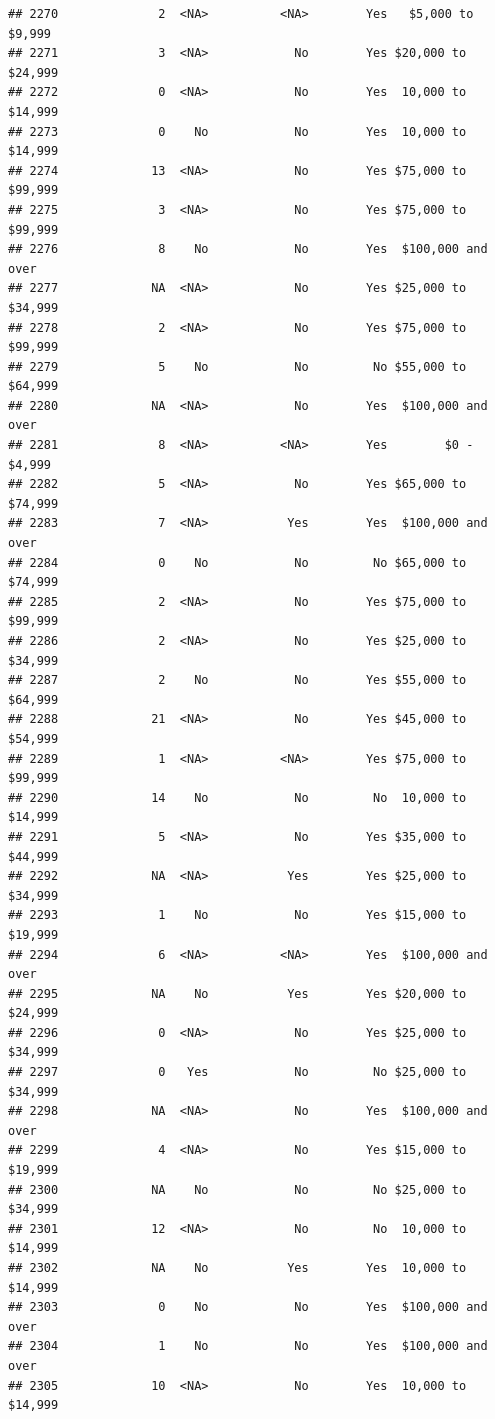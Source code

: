 \documentclass[man]{apa6}
\begin{document}
\begin{verbatim}
## 2270              2  <NA>          <NA>        Yes   $5,000 to $9,999
## 2271              3  <NA>            No        Yes $20,000 to $24,999
## 2272              0  <NA>            No        Yes  10,000 to $14,999
## 2273              0    No            No        Yes  10,000 to $14,999
## 2274             13  <NA>            No        Yes $75,000 to $99,999
## 2275              3  <NA>            No        Yes $75,000 to $99,999
## 2276              8    No            No        Yes  $100,000 and over
## 2277             NA  <NA>            No        Yes $25,000 to $34,999
## 2278              2  <NA>            No        Yes $75,000 to $99,999
## 2279              5    No            No         No $55,000 to $64,999
## 2280             NA  <NA>            No        Yes  $100,000 and over
## 2281              8  <NA>          <NA>        Yes        $0 - $4,999
## 2282              5  <NA>            No        Yes $65,000 to $74,999
## 2283              7  <NA>           Yes        Yes  $100,000 and over
## 2284              0    No            No         No $65,000 to $74,999
## 2285              2  <NA>            No        Yes $75,000 to $99,999
## 2286              2  <NA>            No        Yes $25,000 to $34,999
## 2287              2    No            No        Yes $55,000 to $64,999
## 2288             21  <NA>            No        Yes $45,000 to $54,999
## 2289              1  <NA>          <NA>        Yes $75,000 to $99,999
## 2290             14    No            No         No  10,000 to $14,999
## 2291              5  <NA>            No        Yes $35,000 to $44,999
## 2292             NA  <NA>           Yes        Yes $25,000 to $34,999
## 2293              1    No            No        Yes $15,000 to $19,999
## 2294              6  <NA>          <NA>        Yes  $100,000 and over
## 2295             NA    No           Yes        Yes $20,000 to $24,999
## 2296              0  <NA>            No        Yes $25,000 to $34,999
## 2297              0   Yes            No         No $25,000 to $34,999
## 2298             NA  <NA>            No        Yes  $100,000 and over
## 2299              4  <NA>            No        Yes $15,000 to $19,999
## 2300             NA    No            No         No $25,000 to $34,999
## 2301             12  <NA>            No         No  10,000 to $14,999
## 2302             NA    No           Yes        Yes  10,000 to $14,999
## 2303              0    No            No        Yes  $100,000 and over
## 2304              1    No            No        Yes  $100,000 and over
## 2305             10  <NA>            No        Yes  10,000 to $14,999

\end{verbatim}
\end{document}

